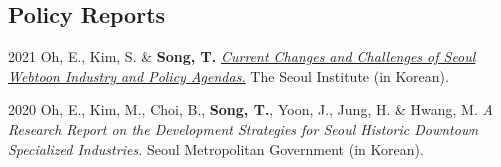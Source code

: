 \documentclass[12pt,letterpaper]{report}
\begin{document}
    \subsection*{Policy Reports}
    \begin{tablist}
        \item[2021] \tab{}Oh, E., Kim, S. \& \textbf{Song, T.} \emph{\href{http://global.si.re.kr/content/current-changes-and-challenges-seoul-webtoon-industry-and-policy-agendas}{Current Changes and Challenges of Seoul Webtoon Industry and Policy Agendas.}} The Seoul Institute (in Korean).
        \item[2020] \tab{}Oh, E., Kim, M., Choi, B., \textbf{Song, T.}, Yoon, J., Jung, H. \& Hwang, M. \emph{A Research Report on the Development Strategies for Seoul Historic Downtown Specialized Industries.} Seoul Metropolitan Government (in Korean).
    \end{tablist}
\end{document}
